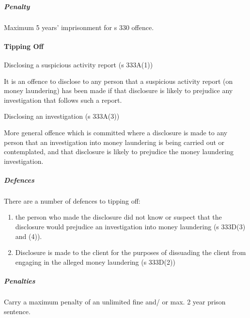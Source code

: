 \documentclass[
]{article}
\providecommand{\tightlist}{%
  \setlength{\itemsep}{0pt}\setlength{\parskip}{0pt}}
\newenvironment{env-28b706cc-8a08-422f-af86-ede86c79505b}
{
    \savenotes\tcolorbox[blanker,breakable,left=5pt,borderline west={2pt}{-4pt}{green}]
}
{
    \endtcolorbox\spewnotes
}
\begin{document}
\hypertarget{penalty}{%
\subparagraph{Penalty}\label{penalty}}

Maximum 5 years' imprisonment for s 330 offence.

\hypertarget{tipping-off}{%
\paragraph{Tipping Off}\label{tipping-off}}

\begin{env-28b706cc-8a08-422f-af86-ede86c79505b}

Disclosing a suspicious activity report (s 333A(1))

It is an offence to disclose to any person that a suspicious activity
report (on money laundering) has been made if that disclosure is likely
to prejudice any investigation that follows such a report.

\end{env-28b706cc-8a08-422f-af86-ede86c79505b}

\begin{env-28b706cc-8a08-422f-af86-ede86c79505b}

Disclosing an investigation (s 333A(3))

More general offence which is committed where a disclosure is made to
any person that an investigation into money laundering is being carried
out or contemplated, and that disclosure is likely to prejudice the
money laundering investigation.

\end{env-28b706cc-8a08-422f-af86-ede86c79505b}

\hypertarget{defences}{%
\subparagraph{Defences}\label{defences}}

There are a number of defences to tipping off:

\begin{enumerate}
\tightlist
\item
  the person who made the disclosure did not know or suspect that the
  disclosure would prejudice an investigation into money laundering (s
  333D(3) and (4)).
\item
  Disclosure is made to the client for the purposes of dissuading the
  client from engaging in the alleged money laundering (s 333D(2))
\end{enumerate}

\hypertarget{penalties}{%
\subparagraph{Penalties}\label{penalties}}

Carry a maximum penalty of an unlimited fine and/ or max. 2 year prison
sentence.
\end{document}
